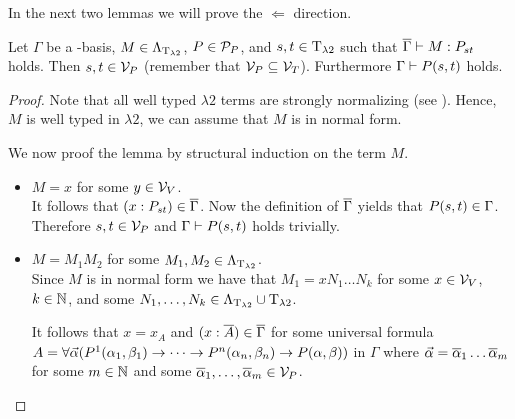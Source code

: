 In the next two lemmas we will prove the $\Leftarrow$ direction.

\begin{lemma}\label{lem.4.3}
Let $\Gamma$ be a \SysP-basis, $M\in\Lambda_{\text{T}_{\lambda2}}$, $P\in\mathcal{P}_P$, and $\predTFst,\predTSnd\in\lambdaTypes$ such that $\trans{\Gamma}\lambdaModels M:\code{P}{\predTFst}{\predTSnd}$ holds.
Then $\predTFst, \predTSnd\in\VarP$ (remember that $\mathcal{V}_P\subseteq\mathcal{V}_T$). Furthermore $\Gamma\PModels P(\predTFst,\predTSnd)$ holds.
\end{lemma}
\begin{proof}
Note that all well typed $\lambda2$ terms are strongly normalizing (see %
). Hence, $M$ is well typed in $\lambda2$, we can assume that $M$ is in normal form. %

We now proof the lemma by structural induction on the term $M$.
\begin{itemize}
	\item[] \underline{$M=x$} for some $y\in\mathcal{V}_V$.\\
		It follows that $(x:\code{P}{\predTFst}{\predTSnd})\in\trans{\Gamma}$.
		Now the definition of $\overline{\Gamma}$ yields that $P(\predTFst,\predTSnd)\in\Gamma$. Therefore $\predTFst,\predTSnd\in\VarP$ and $\Gamma\vdash P(s,t)$ holds trivially.
	\item[] \underline{$M=M_1M_2$} for some $M_1,M_2\in\Lambda_{\text{T}_{\lambda2}}$.\\
		Since $M$ is in normal form we have that $M_1=xN_1\dots N_k$ for some $x\in\mathcal{V}_V$, $k\in\mathbb{N}$, and some $N_1,\dots,N_k\in\Lambda_{\text{T}_{\lambda2}}\cup\text{T}_{\lambda2}$. %
		
		It follows that $x=x_A$ and $(x:\overline{A})\in\overline{\Gamma}$ for some universal formula $A=\forall\predVec(P^1(\predFst[1],\predSnd[1])\to\dots\to P^n(\predFst[n],\predSnd[n])\to P(\predFst,\predSnd))$ in $\Gamma$ where $\predVec=\predVec[1]\dots\predVec[m]$ for some $m\in\mathbb{N}$ and some $\predVec[1],\dots,\predVec[m]\in\VarP$.
		

\end{itemize}
\end{proof}
